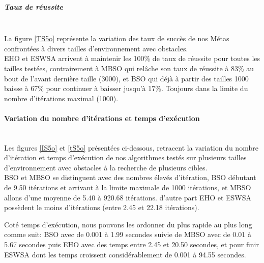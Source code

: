 \noindent
\begin{minipage}[t]{0.5\textwidth}
	\subparagraph{Taux de réussite}
	\textbf{}\\
	
	La figure \ref{TS5o} représente la variation des taux de succès de nos Métas confrontées à divers tailles d'environnement avec obstacles.\\
	
	EHO et ESWSA arrivent à maintenir les 100\% de taux de réussite pour toutes les tailles testées, contrairement à MBSO qui relâche son taux de réussite à 83\% au bout de l'avant dernière taille (3000), et BSO qui déjà à partir des tailles 1000 baisse à 67\% pour continuer à baisser jusqu'à 17\%. Toujours dans la limite du nombre d'itérations maximal (1000).
	
\end{minipage}\hfill
\begin{minipage}[t]{0.55\textwidth}
	\captionsetup{width=0.8\linewidth}
	\centering{}
	\label{TS5o}
\end{minipage}\hfill




\vspace{0.5cm}


\noindent
	\paragraph{Variation du nombre d'itérations et temps d'exécution}
	\textbf{ }\\
	
	Les figures \ref{IS5o} et \ref{tS5o} présentées ci-dessous, retracent la variation du nombre d'itération et temps d'exécution de nos algorithmes testés sur plusieurs tailles d'environnement avec obstacles à la recherche de plusieurs cibles.\\
	
	BSO et MBSO se distinguent avec des nombres élevés d'itération, BSO débutant de 9.50 itérations et arrivant à la limite maximale de 1000 itérations, et MBSO allons d'une moyenne de 5.40 à 920.68 itérations. d'autre part EHO et ESWSA possèdent le moins d'itérations (entre 2.45 et 22.18 itérations).	

	Coté temps d'exécution, nous pouvons les ordonner du plus rapide au plus long comme suit: BSO avec de 0.001 à 1.99 secondes suivie de MBSO avec de 0.01 à 5.67 secondes puis EHO avec des temps entre 2.45 et 20.50 secondes, et pour finir ESWSA dont les temps croissent considérablement de 0.001 à 94.55 secondes. 
	


